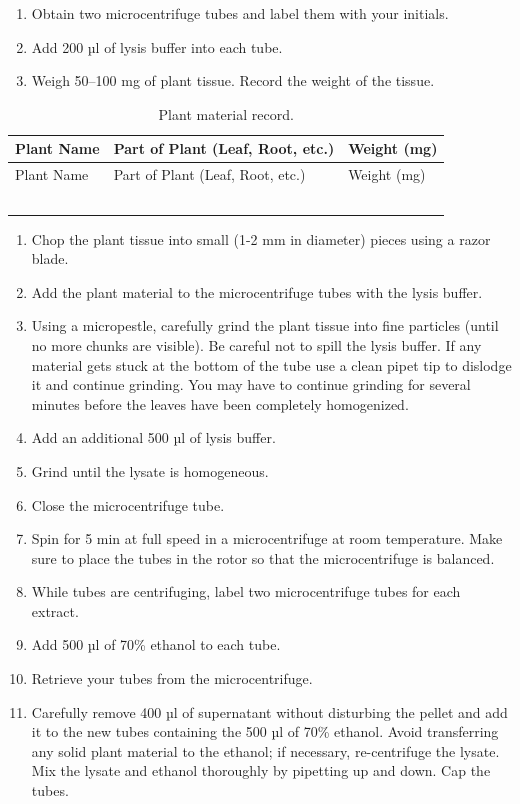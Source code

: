 \documentclass[]{book}
\providecommand{\tightlist}{%
  \setlength{\itemsep}{0pt}\setlength{\parskip}{0pt}}
\begin{document}
\begin{enumerate}
\def\labelenumi{\arabic{enumi}.}
\tightlist
\item
  Obtain two microcentrifuge tubes and label them with your initials.
\item
  Add 200 µl of lysis buffer into each tube.
\item
  Weigh 50--100 mg of plant tissue. Record the weight of the tissue.
\end{enumerate}

\begin{longtable}[]{@{}lll@{}}
\caption{\label{tab:plant} Plant material record.}\tabularnewline
\toprule
Plant Name & Part of Plant (Leaf, Root, etc.) & Weight (mg)\tabularnewline
\midrule
\endfirsthead
\toprule
Plant Name & Part of Plant (Leaf, Root, etc.) & Weight (mg)\tabularnewline
\midrule
\endhead
& &\tabularnewline
& &\tabularnewline
& &\tabularnewline
& &\tabularnewline
& &\tabularnewline
\bottomrule
\end{longtable}

\begin{enumerate}
\def\labelenumi{\arabic{enumi}.}
\setcounter{enumi}{3}
\tightlist
\item
  Chop the plant tissue into small (1-2 mm in diameter) pieces using a razor blade.
\item
  Add the plant material to the microcentrifuge tubes with the lysis buffer.
\item
  Using a micropestle, carefully grind the plant tissue into fine particles (until no more chunks are visible). Be careful not to spill the lysis buffer. If any material gets stuck at the bottom of the tube use a clean pipet tip to dislodge it and continue grinding. You may have to continue grinding for several minutes before the leaves have been completely homogenized.
\item
  Add an additional 500 µl of lysis buffer.
\item
  Grind until the lysate is homogeneous.
\item
  Close the microcentrifuge tube.
\item
  Spin for 5 min at full speed in a microcentrifuge at room temperature. Make sure to place the tubes in the rotor so that the microcentrifuge is balanced.\\
\item
  While tubes are centrifuging, label two microcentrifuge tubes for each extract.
\item
  Add 500 µl of 70\% ethanol to each tube.
\item
  Retrieve your tubes from the microcentrifuge.
\item
  Carefully remove 400 µl of supernatant without disturbing the pellet and add it to the new tubes containing the 500 µl of 70\% ethanol. Avoid transferring any solid plant material to the ethanol; if necessary, re-centrifuge the lysate.
  Mix the lysate and ethanol thoroughly by pipetting up and down. Cap the tubes.
\end{enumerate}
\end{document}
